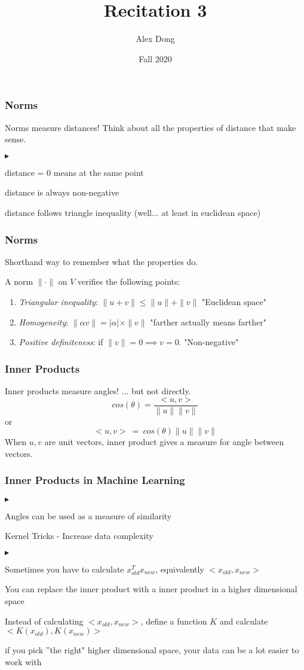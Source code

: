 \documentclass{beamer}
\title{Recitation 3}
\author{Alex Dong}
\institute{CDS, NYU}
\date{Fall 2020}
\renewenvironment{itemize}
\renewenvironment{enumerate}%
{\begin{list}{\arabic{enumi}.}%
      {\setlength{\leftmargin}{2.5em}%
       \setlength{\itemsep}{-\parsep}%
       \setlength{\topsep}{-\parskip}%
       \usecounter{enumi}}%
 }{\end{list}}
\renewenvironment{itemize}%
{\begin{list}{$\blacktriangleright$}%
      {\setlength{\leftmargin}{2.5em}%
       \setlength{\itemsep}{-\parsep}%
       \setlength{\topsep}{-\parskip}%
       \usecounter{enumi}}%
 }{\end{list}}
\begin{document}
\frame{\titlepage} 

\begin{frame}
\frametitle{Norms}
Norms measure distances!
Think about all the properties of distance that make sense.
\begin{itemize}
\item distance = 0 means at the same point
\item distance is always non-negative
\item distance follows triangle inequality (well... at least in euclidean space)
\end{itemize}

\end{frame}

\begin{frame}
\frametitle{Norms}
Shorthand way to remember what the properties do.
\begin{definition}[Norm]
	A norm $\| \cdot \|$ on $V$ verifies the following points:
	\begin{enumerate}
		\item \emph{Triangular inequality}: $\|u + v\| \leq \|u\| + \|v\|$ \hfill "Euclidean space"
		\item \emph{Homogeneity}: $\| \alpha v \| = |\alpha|\times \| v\|$ \hfill "farther actually means farther"
		\item \emph{Positive definiteness}: if $\|v\| = 0 \implies v=0$. \hfill "Non-negative"
	\end{enumerate}
\end{definition}
\end{frame}

\begin{frame}
\frametitle{Inner Products}
Inner products measure angles! 
... but not directly.
$$cos(\theta) = \frac{<u,v>}{\|u\| \|v\|}$$
or
$$<u,v>\ =\ cos(\theta) \|u\|\|v\|$$
When $u,v$ are unit vectors, inner product gives a measure for angle between vectors.
\end{frame}

\begin{frame}
\frametitle{Inner Products in Machine Learning}
\begin{itemize}
\item Angles can be used as a measure of similarity
\item Kernel Tricks - Increase data complexity
\begin{itemize}
\item Sometimes you have to calculate  $x_{old}^T x_{new}$, equivalently $<x_{old},x_{new}>$
\item You can replace the inner product with a inner product in a higher dimensional space
\item Instead of calculating $<x_{old},x_{new}>$, define a function $K$ and calculate $<K(x_{old}),K(x_{new})>$
\item if you pick ''the right" higher dimensional space, your data can be a lot easier to work with
\end{itemize}
\end{itemize}
\end{frame}
\end{document}
